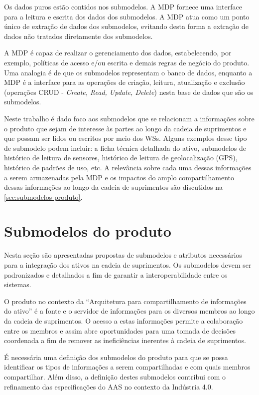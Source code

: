 Os dados puros estão contidos nos submodelos. A MDP fornece uma interface para a leitura e escrita dos dados dos submodelos. A MDP atua como um ponto único de extração de dados dos submodelos, evitando desta forma a extração de dados não tratados diretamente dos submodelos.

A MDP é capaz de realizar o gerenciamento dos dados, estabelecendo, por exemplo, políticas de acesso e/ou escrita e demais regras de negócio do produto. Uma analogia é de que os submodelos representam o banco de dados, enquanto a MDP é a interface para as operações de criação, leitura, atualização e exclusão (operações CRUD - \textit{Create, Read, Update, Delete}) nesta base de dados que são os submodelos.

Neste trabalho é dado foco aos submodelos que se relacionam a informações sobre o produto que sejam de interesse às partes ao longo da cadeia de suprimentos e que possam ser lidos ou escritos por meio dos WSs. Alguns exemplos desse tipo de submodelo podem incluir: a ficha técnica detalhada do ativo, submodelos de histórico de leitura de sensores, histórico de leitura de geolocalização (GPS), histórico de padrões de uso, etc. A relevância sobre cada uma dessas informações a serem armazenadas pela MDP e os impactos do amplo compartilhamento dessas informações ao longo da cadeia de suprimentos são discutidos na \autoref{sec:submodelos-produto}.

\section{Submodelos do produto}
\label{sec:submodelos-produto}

Nesta seção são apresentadas propostas de submodelos e atributos necessários para a integração dos ativos na cadeia de suprimentos. Os submodelos devem ser padronizados e detalhados a fim de garantir a interoperabilidade entre os sistemas.

O produto no contexto da ``Arquitetura para compartilhamento de informações do ativo'' é a fonte e o servidor de informações para os diversos membros ao longo da cadeia de suprimentos. O acesso a estas informações permite a colaboração entre os membros e assim abre oportunidades para uma tomada de decisões coordenada a fim de remover as ineficiências inerentes à cadeia de suprimentos.

É necessária uma definição dos submodelos do produto para que se possa identificar os tipos de informações a serem compartilhadas e com quais membros compartilhar. Além disso, a definição destes submodelos contribui com o refinamento das especificações do AAS no contexto da Indústria 4.0.

